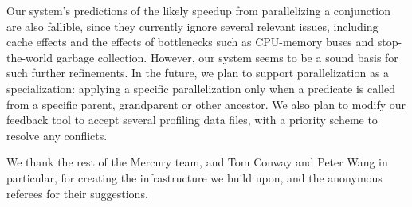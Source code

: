 Our system's predictions of the likely speedup from parallelizing a conjunction
are also fallible, since they currently ignore several relevant issues,
including cache effects
and the effects of bottlenecks
such as CPU-memory buses and stop-the-world garbage collection.
However, our system seems to be a sound basis for such further refinements.
In the future, we plan to support parallelization as a specialization:
applying a specific parallelization only when a predicate is called
from a specific parent, grandparent or other ancestor.
We also plan to modify our feedback tool
to accept several profiling data files,
with a priority scheme to resolve any conflicts.

We thank the rest of the Mercury team,
and Tom Conway and Peter Wang in particular,
for creating the infrastructure we build upon,
and the anonymous referees for their suggestions.



\newpage


